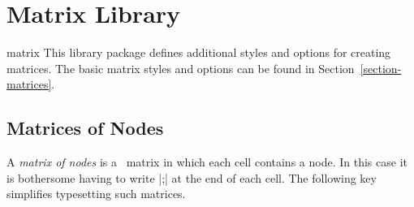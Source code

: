 %
%
%


\section{Matrix Library}

\begin{tikzlibrary}{matrix}
    This library package defines additional styles and options for creating
    matrices. The basic matrix styles and options can be found in
    Section~\ref{section-matrices}.
\end{tikzlibrary}


\subsection{Matrices of Nodes}

A \emph{matrix of nodes} is a \tikzname\ matrix in which each cell contains a
node. In this case it is bothersome having to write |;| at the end of each cell. The following key simplifies
typesetting such matrices.

